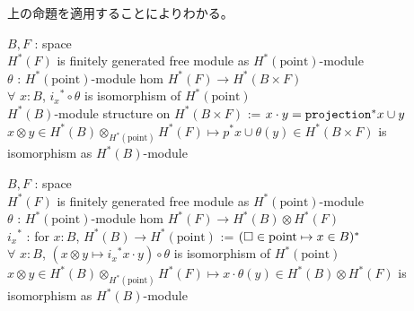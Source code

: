 \documentclass[dvipdfmx]{jsarticle}
\begin{document}
\begin{Proof}
\itemprop
  上の命題を適用することによりわかる。
\end{Proof}

\begin{Theorem}
\itemwhen
  \For \(B,F\) : space \\
  \IfHold \(H^*(F)\) is finitely generated free module as \(H^*(\text{point})\)-module \\
  \For \(\theta\) : \(H^*(\text{point})\)-module hom \(H^*(F) \to H^*(B \times F)\) \\
  \IfHold \(\forall\) \(x:B\), \({i_x}^* \circ \theta\) is isomorphism of \(H^*(\text{point})\) \\
  \Let \(H^*(B)\)-module structure on \(H^*(B \times F)\) := \(x \cdot y = \texttt{projection}^*x \cup y\)
\itemprop
  \Then \(x \otimes y \in H^*(B) \otimes_{H^*(\text{point})} H^*(F) \mapsto p^* x \cup \theta(y) \in H^*(B \times F)\) is isomorphism as \(H^*(B)\)-module
\end{Theorem}

\begin{Theorem}
\itemwhen
  \For \(B,F\) : space \\
  \IfHold \(H^*(F)\) is finitely generated free module as \(H^*(\text{point})\)-module \\
  \For \(\theta\) : \(H^*(\text{point})\)-module hom \(H^*(F) \to H^*(B) \otimes H^*(F)\) \\
  \Let \({i_x}^*\) : for \(x:B\), \(H^*(B) \to H^*(\text{point})\) := \((\square \in \text{point} \mapsto x \in B)^{*}\) \\
  \IfHold \(\forall\) \(x:B\), \((x \otimes y \mapsto {i_x}^* x \cdot y) \circ \theta\) is isomorphism of \(H^*(\text{point})\)
\itemprop
  \Then \(x \otimes y \in H^*(B) \otimes_{H^*(\text{point})} H^*(F) \mapsto x \cdot \theta(y) \in H^*(B) \otimes H^*(F)\) is isomorphism as \(H^*(B)\)-module
\end{Theorem}
\end{document}
